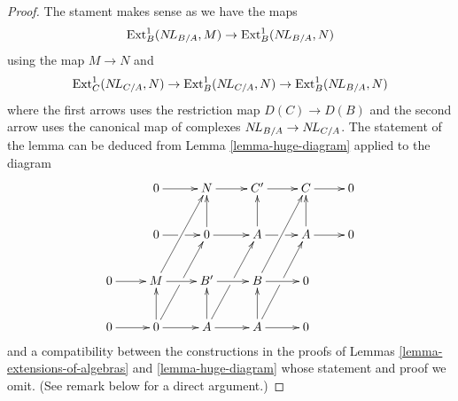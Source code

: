 \begin{proof}
The stament makes sense as we have the maps
$$
\mathop{\mathrm{Ext}}\nolimits^1_B(\mathop{N\!L}\nolimits_{B/A}, M) \to \mathop{\mathrm{Ext}}\nolimits^1_B(\mathop{N\!L}\nolimits_{B/A}, N)
$$
using the map $M \to N$ and
$$
\mathop{\mathrm{Ext}}\nolimits^1_C(\mathop{N\!L}\nolimits_{C/A}, N) \to \mathop{\mathrm{Ext}}\nolimits^1_B(\mathop{N\!L}\nolimits_{C/A}, N) \to \mathop{\mathrm{Ext}}\nolimits^1_B(\mathop{N\!L}\nolimits_{B/A}, N)
$$
where the first arrows uses the restriction map $D(C) \to D(B)$
and the second arrow uses the canonical map of complexes
$\mathop{N\!L}\nolimits_{B/A} \to \mathop{N\!L}\nolimits_{C/A}$. The statement of the lemma can be deduced from
Lemma \ref{lemma-huge-diagram} applied to the diagram
$$
\xymatrix{
& 0 \ar[r] & N \ar[r] & C' \ar[r] & C \ar[r] & 0 \\
& 0 \ar[r]|\hole & 0 \ar[u] \ar[r] &
A \ar[u] \ar[r]|\hole & A \ar[u] \ar[r] & 0 \\
0 \ar[r] & M \ar[ruu] \ar[r] & B' \ar[r] & B \ar[ruu] \ar[r] & 0 \\
0 \ar[r] & 0 \ar[ruu]|\hole \ar[u] \ar[r] &
A \ar[ruu]|\hole \ar[u] \ar[r] & A \ar[ruu]|\hole \ar[u] \ar[r] & 0
}
$$
and a compatibility between the constructions in the proofs
of Lemmas \ref{lemma-extensions-of-algebras} and \ref{lemma-huge-diagram}
whose statement and proof we omit. (See remark below for a direct argument.)
\end{proof}

